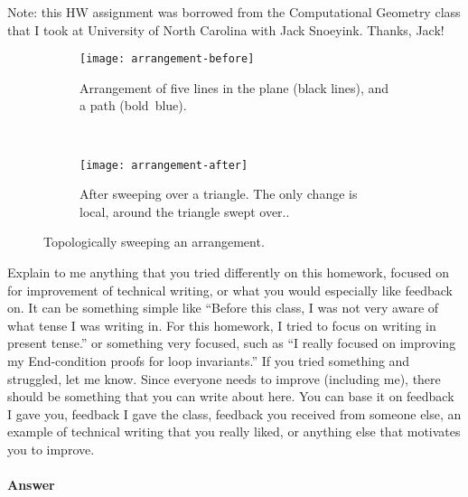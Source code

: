 \documentclass{article}
\begin{document}
Note: this HW assignment was borrowed from the Computational Geometry class that
I took at University of North Carolina with Jack Snoeyink.  Thanks, Jack!

\begin{figure}[bht]
    \centering
    \begin{subfigure}{.31\textwidth}
        \centering
        \texttt{[image: arrangement-before]}
        \caption{Arrangement of five lines in the plane (black lines), and a path
            (bold~blue).}
        \label{fig:arrangement-before}
    \end{subfigure}
    ~
    \begin{subfigure}{.31\textwidth}
        \centering
        \texttt{[image: arrangement-after]}
        \caption{After sweeping over a triangle. The only change is
        local, around the triangle swept over..}
        \label{fig:image-pixvert}
    \end{subfigure}
    \caption{Topologically sweeping an arrangement.}
    \label{fig:arrangement}
\end{figure}


\collab{\todo{}}

Explain to me anything that you tried differently on this homework, focused on
for improvement of technical writing, or what you would especially like feedback
on.  It can be something simple like ``Before this class, I was not very aware
of what tense I was writing in.  For this homework, I tried to focus on writing
in present tense.'' or something very focused, such as ``I really focused on
improving my End-condition proofs for loop invariants.''  If you tried something
and struggled, let me know. Since everyone needs to improve (including me),
there should be something that you can write about here.  You can base it on
feedback I gave you, feedback I gave the class, feedback you received from
someone else, an example of technical writing that you really liked, or anything
else that motivates you to improve.

\paragraph{Answer}

\end{document}
